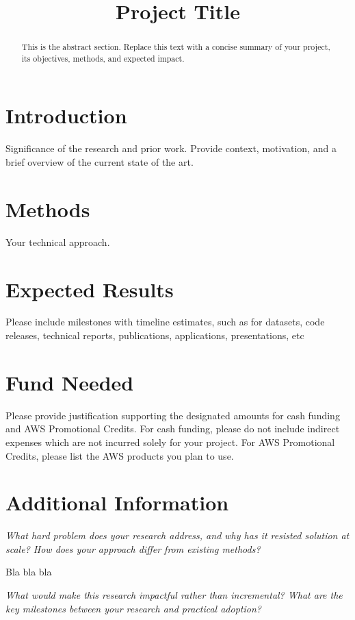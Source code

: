 \documentclass[11pt]{ara-proposal}
\title{Project Title}
\begin{document}
\makeAraTitle

\begin{abstract}
This is the abstract section. Replace this text with a concise summary of your
project, its objectives, methods, and expected impact.
\end{abstract}

\section{Introduction}
Significance of the research and prior work. 
Provide context, motivation, and a brief overview of the current state of the art.

\section{Methods}
Your technical approach.

\section{Expected Results}
Please include milestones with timeline estimates, such as for datasets, code releases, technical reports,
publications, applications, presentations, etc

\section{Fund Needed}
Please provide justification supporting the designated amounts for cash funding and AWS Promotional Credits. For cash funding, please do not include indirect expenses which are not incurred solely for your project. For AWS Promotional Credits, please list the AWS products you plan to use.

\section{Additional Information}
\emph{What hard problem does your research address, and why has it resisted solution at scale? How does your approach differ from existing methods?}

Bla bla bla

\emph{What would make this research impactful rather than incremental? What are the key milestones between your research and practical adoption?}
\end{document}
